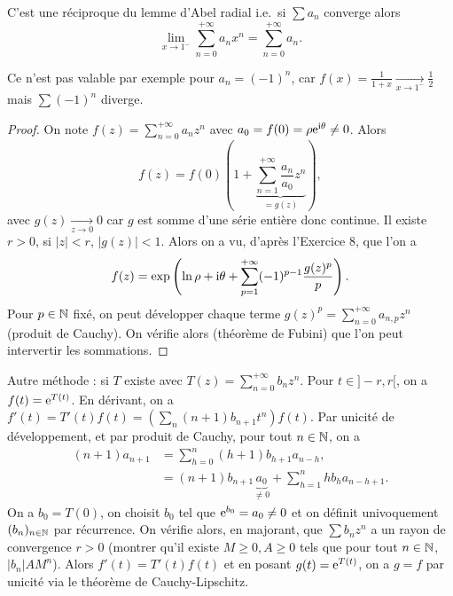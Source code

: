 \documentclass[12pt]{article}
\begin{document}
\begin{remark}
    C'est une réciproque du lemme d'Abel radial i.e.~si $\sum a_n$ converge alors \begin{equation}
        \lim\limits_{x\to1^{-}}\sum_{n=0}^{+\infty}a_nx^{n}=\sum_{n=0}^{+\infty}a_n.
    \end{equation}
\end{remark}

\begin{remark}
    Ce n'est pas valable par exemple pour $a_n=(-1)^{n}$, car $f(x)=\frac{1}{1+x}\xrightarrow[x\to1^{-}]{}\frac{1}{2}$ mais $\sum(-1)^{n}$ diverge.
\end{remark}

\begin{proof}
    On note $f(z)=\sum_{n=0}^{+\infty}a_{n}z^{n}$ avec $a_0=f(0)=\rho\mathrm{e}^{\mathrm{i}\theta}\neq0$. Alors
    \begin{equation}
        f(z)=f(0)\left(1+\underbrace{\sum_{n=1}^{+\infty}\frac{a_n}{a_0}z^{n}}_{=g(z)}\right),
    \end{equation}
    avec $g(z)\xrightarrow[z\to0]{}0$ car $g$ est somme d'une série entière donc continue. Il existe $r>0$, si $\left\lvert z\right\rvert<r$, $\left\lvert g(z)\right\rvert<1$. Alors on a vu, d'après l'Exercice 8, que l'on a 
    \begin{equation}
        f(z)=\exp\left(\ln\rho+\mathrm{i}\theta+\sum_{p=1}^{+\infty}(-1)^{p-1}\frac{g(z)^{p}}{p}\right).
    \end{equation}
    Pour $p\in\mathbb{N}$ fixé, on peut développer chaque terme $g(z)^{p}=\sum_{n=0}^{+\infty}a_{n,p}z^{n}$ (produit de Cauchy). On vérifie alors (théorème de Fubini) que l'on peut intervertir les sommations.
\end{proof}

\begin{remark}
    Autre méthode : si $T$ existe avec $T(z)=\sum_{n=0}^{+\infty}b_nz^{n}$. Pour $t\in]-r,r[$, on a $f(t)=\mathrm{e}^{T(t)}$. En dérivant, on a $f'(t)=T'(t)f(t)=\left(\sum_{n}(n+1)b_{n+1}t^{n}\right)f(t)$. Par unicité de développement, et par produit de Cauchy, pour tout $n\in\mathbb{N}$, on a 
    \begin{align}
        (n+1)a_{n+1}
        &=\sum_{h=0}^{n}(h+1)b_{h+1}a_{n-h},\\
        &=(n+1)b_{n+1}\underbrace{a_{0}}_{\neq0}+\sum_{h=1}^{n}hb_{h}a_{n-h+1}.
    \end{align}
    On a $b_{0}=T(0)$, on choisit $b_{0}$ tel que $\mathrm{e}^{b_{0}}=a_{0}\neq0$ et on définit univoquement $(b_n)_{n\in\mathbb{N}}$ par récurrence. On vérifie alors, en majorant, que $\sum b_{n}z^{n}$ a un rayon de convergence $r>0$ (montrer qu'il existe $M\geqslant0,A\geqslant0$ tels que pour tout $n\in\mathbb{N}$, $\left\lvert b_n\right\rvert AM^{n}$). Alors $f'(t)=T'(t)f(t)$ et en posant $g(t)=\mathrm{e}^{T(t)}$, on a $g=f$ par unicité via le théorème de Cauchy-Lipschitz.
\end{remark}
\end{document}
